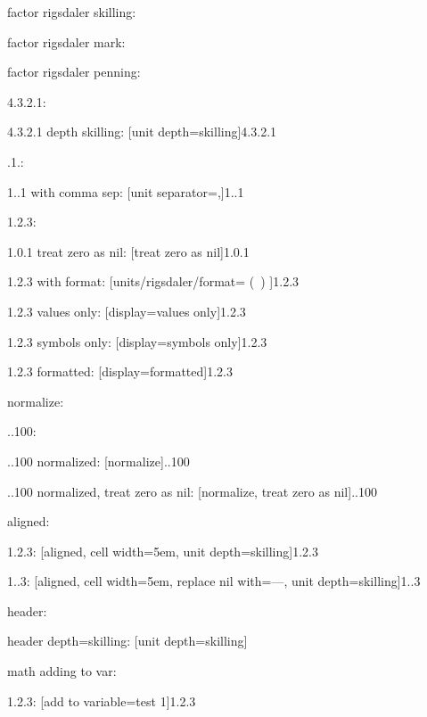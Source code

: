 \documentclass{article}
\begin{document}
factor rigsdaler skilling: \hfill {}

factor rigsdaler mark: \hfill {}

factor rigsdaler penning: \hfill {}

4.3.2.1: \hfill {}

4.3.2.1 depth skilling: \hfill {}[unit depth=skilling]{4.3.2.1}

.1.: \hfill {}

1..1 with comma sep: \hfill {}[unit separator={,}]{1..1}

1.2.3: \hfill {}

1.0.1 treat zero as nil: \hfill {}[treat zero as nil]{1.0.1}

1.2.3 with format: \hfill {}[units/rigsdaler/format={ (\SYMBOL\ \VALUE) }]{1.2.3}

1.2.3 values only: \hfill {}[display=values only]{1.2.3}

1.2.3 symbols only: \hfill {}[display=symbols only]{1.2.3}

1.2.3 formatted: \hfill {}[display=formatted]{1.2.3}

normalize:

..100: \hfill {}

..100 normalized: \hfill {}[normalize]{..100}

..100 normalized, treat zero as nil: \hfill {}[normalize, treat zero as nil]{..100}

aligned:

1.2.3: \hfill {}[aligned, cell width=5em, unit depth=skilling]{1.2.3}

1..3: \hfill {}[aligned, cell width=5em, replace nil with={---}, unit depth=skilling]{1..3}

header: \hfill {}

header depth=skilling: \hfill {}[unit depth=skilling]

math adding to var:

1.2.3: \hfill {}[add to variable=test 1]{1.2.3}
\end{document}
